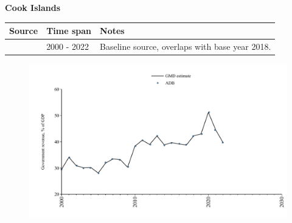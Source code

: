 \documentclass[12pt,a4paper,landscape]{article}
\begin{document}
\begin{adjustbox}{max totalsize={\paperwidth}{\paperheight},center}
\begin{minipage}[t][\textheight][t]{\textwidth}
\vspace*{0.5cm}
{}
\begin{center}
{\Large\bfseries Cook Islands}
\end{center}
\vspace{0.5cm}
\begin{table}[H]
\centering
\small
\begin{tabular}{|l|l|l|}
\hline
\textbf{Source} & \textbf{Time span} & \textbf{Notes} \\
\hline
\rowcolor{white}\cite{ADB}& 2000 - 2022 &Baseline source, overlaps with base year 2018.\\
\hline
\end{tabular}
\end{table}
\begin{figure}[H]
\centering
\includegraphics[width=\textwidth,height=0.6\textheight,keepaspectratio]{graphs/COK_govrev_GDP.pdf}
\end{figure}
\end{minipage}
\end{adjustbox}
\end{document}

